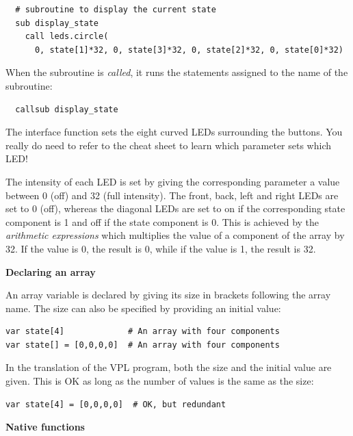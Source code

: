 \documentclass[11pt,a4paper,english]{report}
\begin{document}
\begin{footnotesize}
\begin{verbatim}
  # subroutine to display the current state
  sub display_state
    call leds.circle(
      0, state[1]*32, 0, state[3]*32, 0, state[2]*32, 0, state[0]*32)
\end{verbatim}
\end{footnotesize}

When the subroutine is \emph{called}, it runs the statements assigned to
the name of the subroutine:
\vspace{-1ex}
\begin{footnotesize}
\begin{verbatim}
  callsub display_state
\end{verbatim}
\end{footnotesize}
\vspace{-1ex}
The interface function  sets the eight curved LEDs
surrounding the buttons. You really do need to refer to the cheat sheet
to learn which parameter sets which LED!

The intensity of each LED is set by giving the corresponding parameter a
value between 0 (off) and 32 (full intensity). The front, back,
left and right LEDs are set to 0 (off), whereas the diagonal LEDs are
set to on if the corresponding state component is 1 and off if the state
component is 0. This is achieved by the \emph{arithmetic expressions}
 which multiplies the value of a component of the array
by 32. If the value is 0, the result is 0, while if the value is 1, the
result is 32.

\textbf{\large Declaring an array}

An array variable is declared by giving its size in brackets following
the array name. The size can also be specified by providing an initial
value:

\begin{verbatim}
var state[4]             # An array with four components
var state[] = [0,0,0,0]  # An array with four components
\end{verbatim}

In the translation of the VPL program, both the size and the initial
value are given. This is OK as long as the number of values is the same
as the size:

\begin{verbatim}
var state[4] = [0,0,0,0]  # OK, but redundant
\end{verbatim}

\textbf{\large Native functions}
\end{document}

